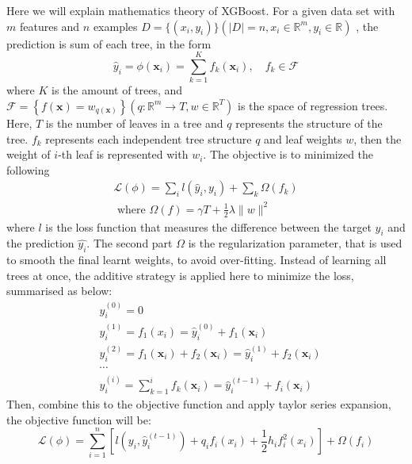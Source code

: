 \documentclass[12pt,a4paper,english
]{tunithesis}
\begin{document}
Here we will explain mathematics theory of XGBoost. For a given data set with $m$ features and $n$ examples $D = \{(x_i, y_i)\}(|D|=n, x_i \in \mathbb{R}^m, y_i \in \mathbb{R})$ , the prediction is sum of each tree, in the form
\begin{equation}
    \hat{y}_i=\phi\left(\mathbf{x}_i\right)=\sum_{k=1}^K f_k\left(\mathbf{x}_i\right), \quad f_k \in \mathcal{F}
\end{equation}
where $K$ is the amount of trees, and $\mathcal{F}=\left\{f(\mathbf{x})=w_{q(\mathbf{x})}\right\}\left(q: \mathbb{R}^m \rightarrow T, w \in \mathbb{R}^T\right)$ is the space of regression trees. Here, $T$ is the number of leaves in a tree and $q$ represents the structure of the tree. $f_k$ represents each independent tree structure $q$ and leaf weights $w$, then the weight of $i$-th leaf is represented with $w_i$. The objective is to minimized the following
\begin{equation}
    \begin{gathered}
\mathcal{L}(\phi)=\sum_i l\left(\hat{y}_i, y_i\right)+\sum_k \Omega\left(f_k\right) \\
\text { where } \Omega(f)=\gamma T+\frac{1}{2} \lambda\|w\|^2
\end{gathered}
\end{equation}
where $l$ is the loss function that measures the difference between the target $y_i$ and the prediction $\hat{y_i}$. The second part $\Omega$ is the regularization parameter, that is used to smooth the final learnt weights, to avoid over-fitting. Instead of learning all trees at once, the additive strategy is applied here to minimize the loss, summarised as below:
\begin{equation}
    \begin{aligned}
& \hat{y}_i^{(0)}=0 \\
& \hat{y}_i^{(1)}=f_1\left(x_i\right)=\hat{y}_i^{(0)}+f_1\left(\mathbf{x}_i\right) \\
& \hat{y}_i^{(2)}=f_1\left(\mathbf{x}_i\right)+f_2\left(\mathbf{x}_i\right)=\hat{y}_i^{(1)}+f_2\left(\mathbf{x}_i\right) \\
& \cdots \\
& \hat{y}_i^{(i)}=\sum_{k=1}^i f_k\left(\mathbf{x}_i\right)=\hat{y}_i^{(t-1)}+f_i\left(\mathbf{x}_i\right)
\end{aligned}
\end{equation}
Then, combine this to the objective function and apply taylor series expansion, the objective function will be:
\begin{equation}
    \mathcal{L}(\phi)=\sum_{i=1}^n\left[l\left(y_i, \hat{y}_i^{(t-1)}\right)+q_i f_i\left(x_i\right)+\frac{1}{2} h_i f_i^2\left(x_i\right)\right]+\Omega\left(f_i\right)
\end{equation}
\end{document}
